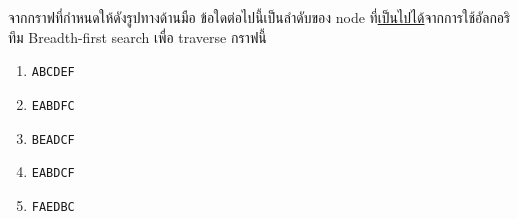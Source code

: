 \question{}

จากกราฟที่กำหนดให้ดังรูปทางด้านมือ ข้อใดต่อไปนี้เป็นลำดับของ node ที่\uline{เป็นไปได้}จากการใช้อัลกอริทึม 
Breadth-first search เพื่อ traverse กราฟนี้

\begin{multicols}{5}
    \begin{enumerate}[label={$\Circle$}]
        \item \verb|ABCDEF|
        \item \verb|EABDFC|
        \item \verb|BEADCF|
        \item \verb|EABDCF|
        \item \verb|FAEDBC|
    \end{enumerate}
\end{multicols}

